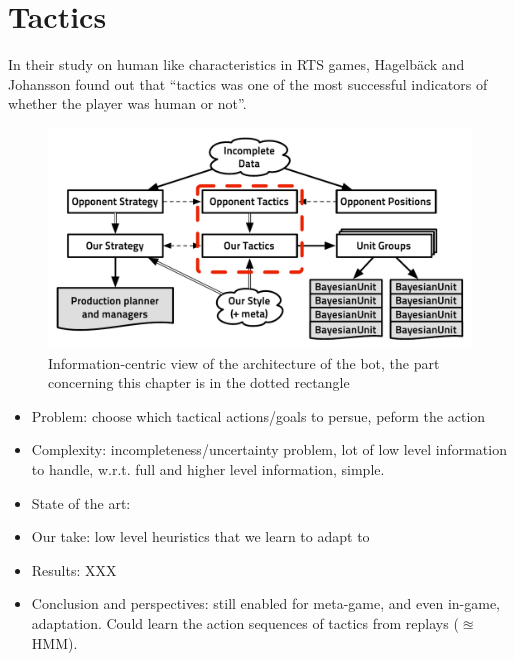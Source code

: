 \chapter{Tactics}
In their study on human like characteristics in RTS games, Hagelb\"{a}ck and Johansson \cite{HagelbackCIG10} found out that ``tactics was one of the most successful indicators of whether the player was human or not''. 

\begin{figure}[!ht]
\begin{center}
\includegraphics[width=13cm]{images/starcraft_bbq_concept_TACTICS.pdf}
\end{center}
\label{fig:conceptTACTICS}
\caption{Information-centric view of the architecture of the bot, the part concerning this chapter is in the dotted rectangle}
\end{figure}
\begin{itemize}
\item Problem: choose which tactical actions/goals to persue, peform the action
\item Complexity: incompleteness/uncertainty problem, lot of low level information to handle, w.r.t. full and higher level information, simple.
\item State of the art: \citep{SORTS, Weber2010cr, UCT, CadenaG11}
\item Our take: low level heuristics that we learn to adapt to
\item Results: XXX
\item Conclusion and perspectives: still enabled for meta-game, and even in-game, adaptation. Could learn the action sequences of tactics from replays ($\approxeq$HMM).
\end{itemize}

